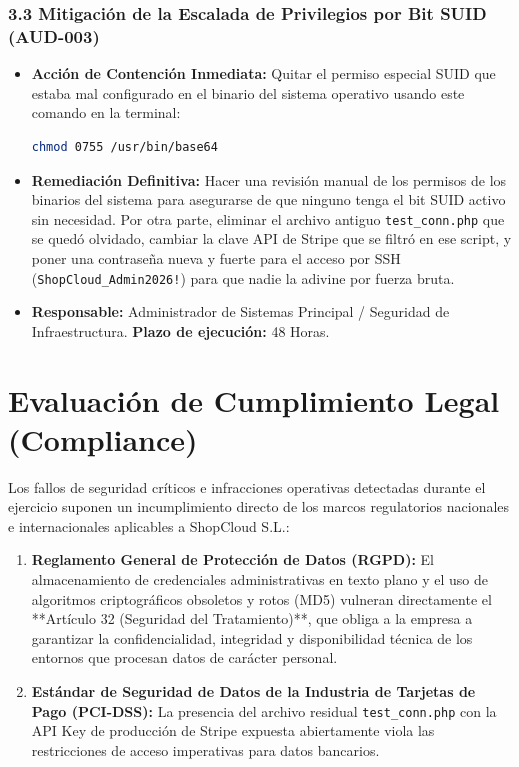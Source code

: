 \documentclass[11pt,a4paper]{report}
\begin{document}
\subsection*{3.3 Mitigación de la Escalada de Privilegios por Bit SUID (AUD-003)}
\begin{itemize}
    \item \textbf{Acción de Contención Inmediata:} Quitar el permiso especial SUID que estaba mal configurado en el binario del sistema operativo usando este comando en la terminal:
    \begin{lstlisting}[language=bash]
    chmod 0755 /usr/bin/base64
    \end{lstlisting}
    \item \textbf{Remediación Definitiva:} Hacer una revisión manual de los permisos de los binarios del sistema para asegurarse de que ninguno tenga el bit SUID activo sin necesidad. Por otra parte, eliminar el archivo antiguo \texttt{test\_conn.php} que se quedó olvidado, cambiar la clave API de Stripe que se filtró en ese script, y poner una contraseña nueva y fuerte para el acceso por SSH (\texttt{ShopCloud\_Admin2026!}) para que nadie la adivine por fuerza bruta.
    \item \textbf{Responsable:} Administrador de Sistemas Principal / Seguridad de Infraestructura. \textbf{Plazo de ejecución:} 48 Horas.
\end{itemize}


\chapter{Evaluación de Cumplimiento Legal (Compliance)}

Los fallos de seguridad críticos e infracciones operativas detectadas durante el ejercicio suponen un incumplimiento directo de los marcos regulatorios nacionales e internacionales aplicables a ShopCloud S.L.:

\begin{enumerate}
    \item \textbf{Reglamento General de Protección de Datos (RGPD):} El almacenamiento de credenciales administrativas en texto plano y el uso de algoritmos criptográficos obsoletos y rotos (MD5) vulneran directamente el **Artículo 32 (Seguridad del Tratamiento)**, que obliga a la empresa a garantizar la confidencialidad, integridad y disponibilidad técnica de los entornos que procesan datos de carácter personal.
    \item \textbf{Estándar de Seguridad de Datos de la Industria de Tarjetas de Pago (PCI-DSS):} La presencia del archivo residual \texttt{test\_conn.php} con la API Key de producción de Stripe expuesta abiertamente viola las restricciones de acceso imperativas para datos bancarios.
\end{enumerate}
\end{document}
